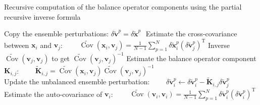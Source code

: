 \documentclass[12pt]{article}
\DeclareMathOperator{\Cov}{Cov}
\begin{document}
\begin{algorithm}[!ht]
\caption{Recursive computation of the balance operator components using the partial recursive inverse formula \label{algo:partial}}
\begin{algorithmic}
\STATE Copy the ensemble perturbations:
\STATE $\delta \widetilde{\mathbf{v}}^p = \delta \widetilde{\mathbf{x}}^p$
\ENDFOR
\STATE $ $
\STATE Estimate the cross-covariance between $\mathbf{x}_i$ and $\mathbf{v}_j$:
\STATE $\displaystyle \qquad \widetilde{\Cov}\left(\mathbf{x}_i,\mathbf{v}_j\right) = \frac{1}{N-1} \sum_{p=1}^N \delta \widetilde{\mathbf{x}}^p_i \left(\delta \widetilde{\mathbf{v}}^p_j\right)^\mathrm{T}$
\STATE Inverse $\widetilde{\Cov}\left(\mathbf{v}_j,\mathbf{v}_j\right)$ to get $\widetilde{\Cov} \left(\mathbf{v}_j,\mathbf{v}_j\right)^{-1}$
\STATE Estimate the balance operator component $\mathbf{K}_{i,j}$:
\STATE $\displaystyle \qquad \widetilde{\mathbf{K}}_{i,j} = \widetilde{\Cov} \left(\mathbf{x}_i,\mathbf{v}_j\right)\widetilde{\Cov} \left(\mathbf{v}_j,\mathbf{v}_j\right)^{-1}$
\ENDFOR
\STATE $  $\\
\STATE Update the unbalanced ensemble perturbation:
\STATE $\displaystyle \qquad \delta \widetilde{\mathbf{v}}^p_i \leftarrow \delta \widetilde{\mathbf{v}}^p_i - \widetilde{\mathbf{K}}_{i,j} \delta \widetilde{\mathbf{v}}^p_j$
\ENDFOR
\ENDFOR
\STATE $  $\\
\STATE Estimate the auto-covariance of $\mathbf{v}_i$:
\STATE $\displaystyle \qquad \widetilde{\Cov}\left(\mathbf{v}_i,\mathbf{v}_i\right) = \frac{1}{N-1} \sum_{p=1}^N \delta \widetilde{\mathbf{v}}^p_i \left(\delta \widetilde{\mathbf{v}}^p_i\right)^\mathrm{T}$
\ENDFOR
\end{algorithmic}
\end{algorithm}
\end{document}
